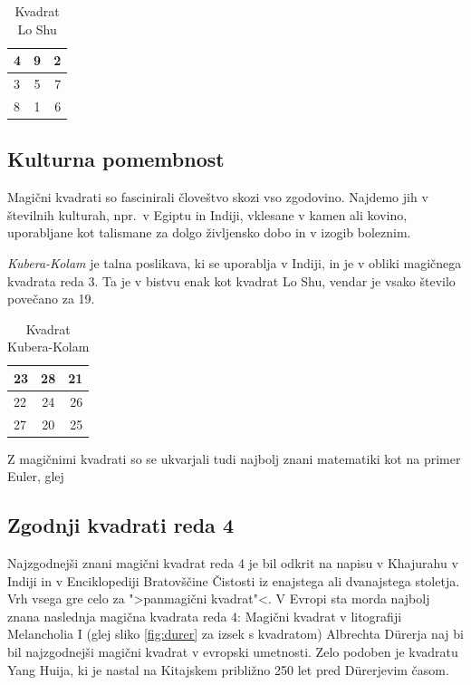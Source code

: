 \documentclass[a4paper,12pt]{article}
\begin{document}
\begin {table}[h!]
   \begin{center}
      \caption{Kvadrat Lo Shu}
      \label{table:loshu}
      \begin{tabular}{l | c | r}
         4 & 9 & 2 \\\hline
         3 & 5 & 7 \\\hline
         8 & 1 & 6 \\\hline
      \end{tabular}
   \end{center}
\end{table}

\subsection{Kulturna pomembnost}

Magični kvadrati so fascinirali človeštvo skozi vso zgodovino. Najdemo jih
v številnih kulturah, npr.\ v Egiptu in Indiji, vklesane v kamen ali
kovino, uporabljane kot talismane za dolgo življensko dobo in v
izogib boleznim.

\emph{Kubera-Kolam} je talna poslikava, ki se uporablja v Indiji, in je v
obliki magičnega kvadrata reda 3. Ta je v bistvu enak kot kvadrat
Lo Shu, vendar je vsako število povečano za 19.

\begin {table}[h!]
   \begin{center}
      \caption{Kvadrat Kubera-Kolam}
      \label{table:kubera}
      \begin{tabular}{l | c | r}
         23 & 28 & 21 \\\hline
         22 & 24 & 26 \\\hline
         27 & 20 & 25 \\\hline
      \end{tabular}
   \end{center}
\end{table}

Z magičnimi kvadrati so se ukvarjali tudi najbolj znani matematiki kot na
primer Euler, glej \cite{euler}

\subsection{Zgodnji kvadrati reda 4}

Najzgodnejši znani magični kvadrat reda 4 je bil odkrit na napisu
v Khajurahu v Indiji in v Enciklopediji Bratovščine Čistosti iz enajstega
ali dvanajstega stoletja. Vrh vsega gre celo za ">panmagični kvadrat"<.
V Evropi sta morda najbolj znana naslednja magična kvadrata reda 4:
%
Magični kvadrat v litografiji Melancholia I (glej sliko \ref{fig:durer} za izsek s kvadratom) Albrechta Dürerja naj bi bil najzgodnejši magični kvadrat
v evropski umetnosti. Zelo podoben je kvadratu Yang Huija, ki je nastal na Kitajskem
približno 250 let pred Dürerjevim časom.
\end{document}
